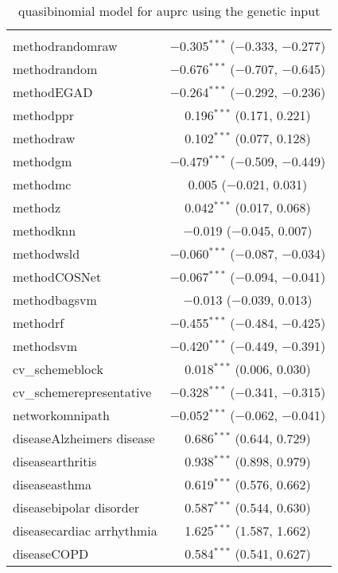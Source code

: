 
\begin{table}[!htbp] \centering 
  \caption{quasibinomial model for auprc using the genetic input} 
  \label{} 
\begin{tabular}{@{\extracolsep{5pt}}lc} 
\\[-1.8ex]\hline 
\hline \\[-1.8ex] 
 methodrandomraw & $-$0.305$^{***}$ ($-$0.333, $-$0.277) \\ 
  methodrandom & $-$0.676$^{***}$ ($-$0.707, $-$0.645) \\ 
  methodEGAD & $-$0.264$^{***}$ ($-$0.292, $-$0.236) \\ 
  methodppr & 0.196$^{***}$ (0.171, 0.221) \\ 
  methodraw & 0.102$^{***}$ (0.077, 0.128) \\ 
  methodgm & $-$0.479$^{***}$ ($-$0.509, $-$0.449) \\ 
  methodmc & 0.005 ($-$0.021, 0.031) \\ 
  methodz & 0.042$^{***}$ (0.017, 0.068) \\ 
  methodknn & $-$0.019 ($-$0.045, 0.007) \\ 
  methodwsld & $-$0.060$^{***}$ ($-$0.087, $-$0.034) \\ 
  methodCOSNet & $-$0.067$^{***}$ ($-$0.094, $-$0.041) \\ 
  methodbagsvm & $-$0.013 ($-$0.039, 0.013) \\ 
  methodrf & $-$0.455$^{***}$ ($-$0.484, $-$0.425) \\ 
  methodsvm & $-$0.420$^{***}$ ($-$0.449, $-$0.391) \\ 
  cv\_schemeblock & 0.018$^{***}$ (0.006, 0.030) \\ 
  cv\_schemerepresentative & $-$0.328$^{***}$ ($-$0.341, $-$0.315) \\ 
  networkomnipath & $-$0.052$^{***}$ ($-$0.062, $-$0.041) \\ 
  diseaseAlzheimers disease & 0.686$^{***}$ (0.644, 0.729) \\ 
  diseasearthritis & 0.938$^{***}$ (0.898, 0.979) \\ 
  diseaseasthma & 0.619$^{***}$ (0.576, 0.662) \\ 
  diseasebipolar disorder & 0.587$^{***}$ (0.544, 0.630) \\ 
  diseasecardiac arrhythmia & 1.625$^{***}$ (1.587, 1.662) \\ 
  diseaseCOPD & 0.584$^{***}$ (0.541, 0.627) \\ 

\end{tabular}
\end{table}
